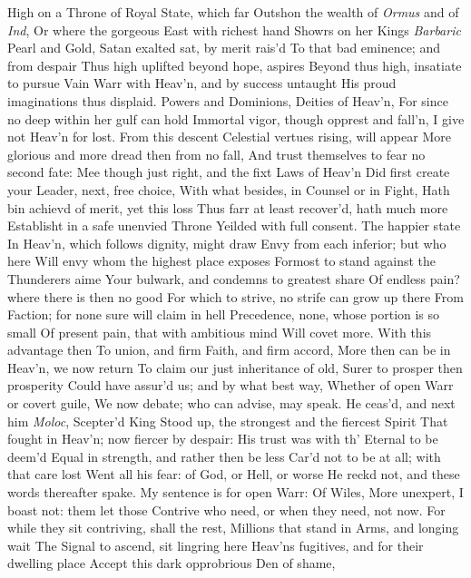 \documentclass[11pt]{book}
\newcounter {first}
\begin{document}
\Book
High on a Throne of Royal State, which far 
Outshon the wealth of \textit{Ormus} and of \textit{Ind}, 
Or where the gorgeous East with richest hand 
Showrs on her Kings \textit{Barbaric} Pearl and Gold, 
Satan exalted sat, by merit rais'd 
To that bad eminence; and from despair 
Thus high uplifted beyond hope, aspires 
Beyond thus high, insatiate to pursue 
Vain Warr with Heav'n, and by success untaught 
His proud imaginations thus displaid. 
\quad Powers and Dominions, Deities of Heav'n, 
For since no deep within her gulf can hold 
Immortal vigor, though opprest and fall'n, 
I give not Heav'n for lost.  From this descent 
Celestial vertues rising, will appear 
More glorious and more dread then from no fall, 
And trust themselves to fear no second fate: 
Mee though just right, and the fixt Laws of Heav'n 
Did first create your Leader, next, free choice, 
With what besides, in Counsel or in Fight, 
Hath bin achievd of merit, yet this loss 
Thus farr at least recover'd, hath much more 
Establisht in a safe unenvied Throne 
Yeilded with full consent.  The happier state 
In Heav'n, which follows dignity, might draw 
Envy from each inferior; but who here 
Will envy whom the highest place exposes 
Formost to stand against the Thunderers aime 
Your bulwark, and condemns to greatest share 
Of endless pain? where there is then no good 
For which to strive, no strife can grow up there 
From Faction; for none sure will claim in hell 
Precedence, none, whose portion is so small 
Of present pain, that with ambitious mind 
Will covet more.  With this advantage then 
To union, and firm Faith, and firm accord, 
More then can be in Heav'n, we now return 
To claim our just inheritance of old, 
Surer to prosper then prosperity 
Could have assur'd us; and by what best way, 
Whether of open Warr or covert guile, 
We now debate; who can advise, may speak. 
\quad He ceas'd, and next him \textit{Moloc}, Scepter'd King 
Stood up, the strongest and the fiercest Spirit 
That fought in Heav'n; now fiercer by despair: 
His trust was with th' Eternal to be deem'd 
Equal in strength, and rather then be less 
Car'd not to be at all; with that care lost 
Went all his fear: of God, or Hell, or worse 
He reckd not, and these words thereafter spake. 
\quad My sentence is for open Warr: Of Wiles, 
More unexpert, I boast not: them let those 
Contrive who need, or when they need, not now. 
For while they sit contriving, shall the rest, 
Millions that stand in Arms, and longing wait 
The Signal to ascend, sit lingring here 
Heav'ns fugitives, and for their dwelling place 
Accept this dark opprobrious Den of shame, 
\end{document}
